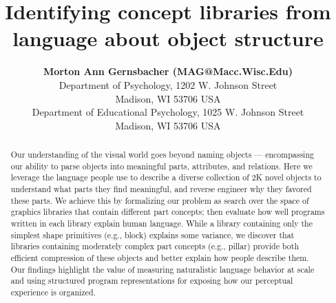 \documentclass[10pt,letterpaper]{article}
\title{Identifying concept libraries from language about object structure}
\author{{\large \bf Morton Ann Gernsbacher (MAG@Macc.Wisc.Edu)} \\
  Department of Psychology, 1202 W. Johnson Street \\
  Madison, WI 53706 USA
  \AND {\large \bf Sharon J.~Derry (SDJ@Macc.Wisc.Edu)} \\
  Department of Educational Psychology, 1025 W. Johnson Street \\
  Madison, WI 53706 USA}
\begin{document}
\maketitle


\begin{abstract} %
Our understanding of the visual world goes beyond naming objects --- encompassing our ability to parse objects into meaningful parts, attributes, and relations. 
Here we leverage the language people use to describe a diverse collection of 2K novel objects to understand what parts they find meaningful, and reverse engineer why they favored these parts. 
We achieve this by formalizing our problem as search over the space of graphics libraries that contain different part concepts;
then evaluate how well programs written in each library explain human language.
While a library containing only the simplest shape primitives (e.g., block) explains some variance, we discover that libraries containing moderately complex part concepts (e.g., pillar) provide both efficient compression of these objects and better explain how people describe them.
Our findings highlight the value of measuring naturalistic language behavior at scale and using structured program representations for exposing how our perceptual 
experience is organized. 



\end{abstract}
\end{document}
